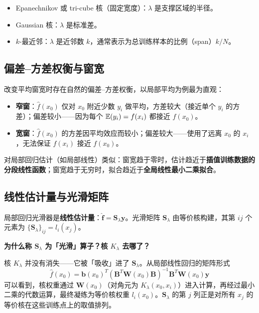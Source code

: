 \begin{itemize}
    \item Epanechnikov 或 tri-cube 核（固定宽度）：$\lambda$ 是支撑区域的半径。
    \item Gaussian 核：$\lambda$ 是标准差。
    \item $k$-最近邻：$\lambda$ 是近邻数 $k$，通常表示为总训练样本的比例（span）$k/N$。
\end{itemize}

\subsection{偏差--方差权衡与窗宽}

改变平均窗宽时存在自然的偏差--方差权衡，以局部平均为例最为直观：

\begin{itemize}
    \item \textbf{窄窗}：$\hat{f}(x_0)$ 仅对 $x_0$ 附近少数 $y_i$ 做平均，方差较大（接近单个 $y_i$ 的方差）；偏差较小——因为每个 $\mathbb{E}(y_i) = f(x_i)$ 都接近 $f(x_0)$。
    \item \textbf{宽窗}：$\hat{f}(x_0)$ 的方差因平均效应而较小；偏差较大——使用了远离 $x_0$ 的 $x_i$，无法保证 $f(x_i)$ 接近 $f(x_0)$。
\end{itemize}

对局部回归估计（如局部线性）类似：窗宽趋于零时，估计趋近于\textbf{插值训练数据的分段线性函数}；窗宽趋于无穷时，拟合趋近于\textbf{全局线性最小二乘拟合}。

\subsection{线性估计量与光滑矩阵}

局部回归光滑器是\textbf{线性估计量}：$\hat{\mathbf{f}} = \mathbf{S}_\lambda \mathbf{y}$。光滑矩阵 $\mathbf{S}_\lambda$ 由等价核构建，其第 $ij$ 个元素为 $\{\mathbf{S}_\lambda\}_{ij} = l_i(x_j)$。

\medskip
\textbf{为什么称 $\mathbf{S}_\lambda$ 为「光滑」算子？核 $K_\lambda$ 去哪了？}

核 $K_\lambda$ 并没有消失——它被「吸收」进了 $\mathbf{S}_\lambda$。从局部线性回归的矩阵形式
\[
\hat{f}(x_0) = \mathbf{b}(x_0)^T (\mathbf{B}^T \mathbf{W}(x_0) \mathbf{B})^{-1} \mathbf{B}^T \mathbf{W}(x_0) \mathbf{y}
\]
可以看到，核权重通过 $\mathbf{W}(x_0)$（对角元为 $K_\lambda(x_0, x_i)$）进入计算，再经过最小二乘的代数运算，最终凝练为等价核权重 $l_i(x_0)$。$\mathbf{S}_\lambda$ 的第 $j$ 列正是对所有 $x_j$ 的等价核在这些训练点上的取值排列。

